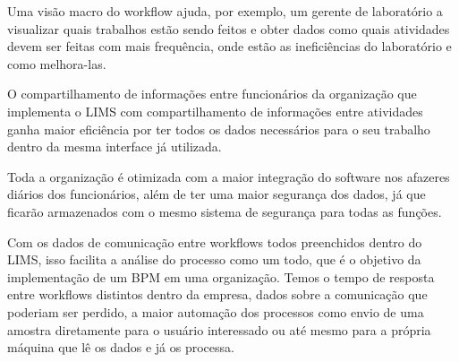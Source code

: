 
Uma visão macro do workflow ajuda, por exemplo, um gerente de laboratório a visualizar quais trabalhos estão sendo feitos e obter dados como quais atividades devem ser feitas com mais frequência, onde estão as ineficiências do laboratório e como melhora-las.

O compartilhamento de informações entre funcionários da organização que implementa o LIMS com compartilhamento de informações entre atividades ganha maior eficiência por ter todos os dados necessários para o seu trabalho dentro da mesma interface já utilizada.

Toda a organização é otimizada com a maior integração do software nos afazeres diários dos funcionários, além de ter uma maior segurança dos dados, já que ficarão armazenados com o mesmo sistema de segurança para todas as funções.


Com os dados de comunicação entre workflows todos preenchidos dentro do LIMS, isso facilita a análise do processo como um todo, que é o objetivo da implementação de um BPM em uma organização. Temos o tempo de resposta entre workflows distintos dentro da empresa, dados sobre a comunicação que poderiam ser perdido, a maior automação dos processos como envio de uma amostra diretamente para o usuário interessado ou até mesmo para a própria máquina que lê os dados e já os processa.